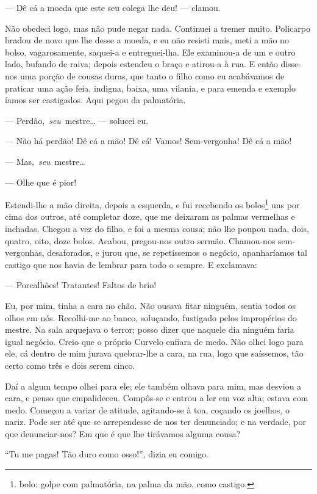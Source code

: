 --- Dê cá a moeda que este seu colega lhe deu! --- clamou.

Não obedeci logo, mas não pude negar nada. Continuei a tremer muito.
Policarpo bradou de novo que lhe desse a moeda, e eu não resisti mais,
meti a mão no bolso, vagarosamente, saquei-a e entreguei-lha. Ele
examinou-a de um e outro lado, bufando de raiva; depois estendeu o braço
e atirou-a à rua. E então disse-nos uma porção de cousas duras, que
tanto o filho como eu acabávamos de praticar uma ação feia, indigna,
baixa, uma vilania, e para emenda e exemplo íamos ser castigados. Aqui
pegou da palmatória.

--- Perdão,~\emph{seu}~mestre\ldots{} --- solucei eu.

--- Não há perdão! Dê cá a mão! Dê cá! Vamos! Sem-vergonha! Dê cá a mão!

--- Mas,~\emph{seu}~mestre\ldots{}

--- Olhe que é pior!

Estendi-lhe a mão direita, depois a esquerda, e fui recebendo os
bolos\footnote{bolo: golpe com palmatória, na palma da mão, como
  castigo.} uns por cima dos outros, até completar doze, que me deixaram
as palmas vermelhas e inchadas. Chegou a vez do filho, e foi a mesma
cousa; não lhe poupou nada, dois, quatro, oito, doze bolos. Acabou,
pregou-nos outro sermão. Chamou-nos sem-vergonhas, desaforados, e jurou
que, se repetíssemos o negócio, apanharíamos tal castigo que nos havia
de lembrar para todo o sempre. E exclamava:

--- Porcalhões! Tratantes! Faltos de brio!

Eu, por mim, tinha a cara no chão. Não ousava fitar ninguém, sentia
todos os olhos em nós. Recolhi-me ao banco, soluçando, fustigado pelos
impropérios do mestre. Na sala arquejava o terror; posso dizer que
naquele dia ninguém faria igual negócio. Creio que o próprio Curvelo
enfiara de medo. Não olhei logo para ele, cá dentro de mim jurava
quebrar-lhe a cara, na rua, logo que saíssemos, tão certo como três e
dois serem cinco.

Daí a algum tempo olhei para ele; ele também olhava para mim, mas
desviou a cara, e penso que empalideceu. Compôs-se e entrou a ler em voz
alta; estava com medo. Começou a variar de atitude, agitando-se à toa,
coçando os joelhos, o nariz. Pode ser até que se arrependesse de nos ter
denunciado; e na verdade, por que denunciar-nos? Em que é que lhe
tirávamos alguma cousa?

``Tu me pagas! Tão duro como osso!'', dizia eu comigo.

